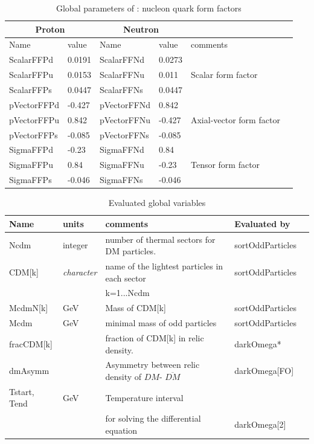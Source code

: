 \documentclass[12pt,a4paper]{article}
\begin{document}
\begin{table}[ht!]\centering
\caption{Global parameters of \micro :  nucleon quark form factors}\label{FFTab}
\begin{tabular}{|l|l|l|l|l|l|}
\hline
 \multicolumn{2}{|c|}{Proton}& \multicolumn{2}{|c|}{Neutron} & \\ \hline
  Name      &  value       &  Name      &  value     &  comments \\  \hline
ScalarFFPd  &  0.0191     &ScalarFFNd  &  0.0273  & \\
ScalarFFPu  &  0.0153     &ScalarFFNu  &  0.011 & Scalar form factor \\
ScalarFFPs  &  0.0447      &ScalarFFNs  &  0.0447   & \\
\hline
pVectorFFPd &  -0.427      &pVectorFFNd &  0.842    & \\
pVectorFFPu &   0.842      &pVectorFFNu &  -0.427   & Axial-vector form factor\\
pVectorFFPs &  -0.085      &pVectorFFNs &  -0.085   & \\
\hline
SigmaFFPd   &  -0.23       &SigmaFFNd   &  0.84     & \\
SigmaFFPu   &   0.84       &SigmaFFNu   &  -0.23    & Tensor form factor\\
SigmaFFPs   &   -0.046     &SigmaFFNs   &  -0.046   & \\
\hline
\end{tabular}\vspace*{3mm}
\end{table}

\begin{table}[ht!]\centering
 \caption{Evaluated global  variables}
 \label{paramTabEval}
\begin{tabular}{|l|l|l|l|l|}
\hline
  Name      & units          & comments                                       & Evaluated by      \\  \hline
  Ncdm      & integer        & number of thermal sectors for DM particles.    & sortOddParticles  \\     
  CDM[k]    &{\it character} &  name of the lightest particles in each sector & sortOddParticles  \\
            &                &k=1...Ncdm                                      &                   \\ 
  McdmN[k]  &  GeV           & Mass of  CDM[k]                                & sortOddParticles  \\ 
  Mcdm      &  GeV           & minimal mass of odd particles                  & sortOddParticles  \\
  fracCDM[k]  &               & fraction of CDM[k]  in relic density.         &  darkOmega*         \\
  dmAsymm   &                & Asymmetry between relic density of ${DM}$- $\overline{DM}$ & darkOmega[FO]\\
  Tstart, Tend &   GeV       & Temperature interval& \\
&&   for solving the differential equation     &  darkOmega[2]\\  
\hline
\end{tabular}\vspace*{3mm}
\end{table}
\end{document}
